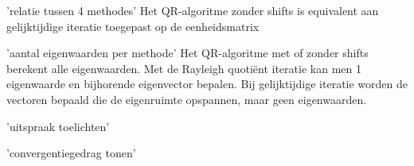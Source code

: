 'relatie tussen 4 methodes'
Het QR-algoritme zonder shifts is equivalent aan gelijktijdige iteratie toegepast op de eenheidsmatrix

'aantal eigenwaarden per methode'
Het QR-algoritme met of zonder shifts berekent alle eigenwaarden. Met de Rayleigh quotiënt iteratie kan men 1 eigenwaarde en bijhorende eigenvector bepalen. Bij gelijktijdige iteratie worden de vectoren bepaald die de eigenruimte opspannen, maar geen eigenwaarden.

'uitspraak toelichten'

'convergentiegedrag tonen'
